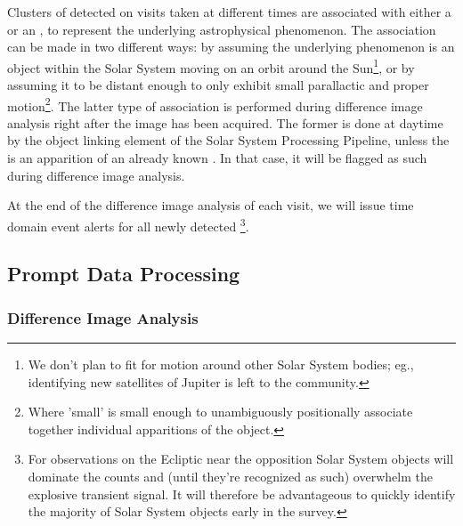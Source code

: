 Clusters of \DIASources detected on visits taken at different times are associated with either a \DIAObject or an \SSObject, to represent the underlying astrophysical phenomenon. The association can be made in two different ways: by assuming the underlying phenomenon is an object within the Solar System moving on an orbit around the Sun\footnote{We don't plan to fit for motion around other Solar System bodies; eg., identifying new satellites of Jupiter is left to the community.}, or by assuming it to be distant enough to only exhibit small parallactic and proper motion\footnote{Where 'small' is small enough to unambiguously positionally associate together individual apparitions of the object.}. The latter type of association is performed during difference image analysis right after the image has been acquired. The former is done at daytime by the object linking element of the Solar System Processing Pipeline, unless the \DIASource is an apparition of an already known \SSObject. In that case, it will be flagged as such during difference image analysis.

At the end of the difference image analysis of each visit, we will issue time domain event alerts for all newly %
detected \DIASources\footnote{For observations on the Ecliptic near the opposition Solar System objects will dominate the \DIASource counts and (until they're recognized as such) overwhelm the explosive transient signal. It will therefore be advantageous to quickly identify the majority of Solar System objects early in the survey.}.

\subsection{Prompt Data Processing}

\subsubsection{Difference Image Analysis}
\label{sec:dia}

